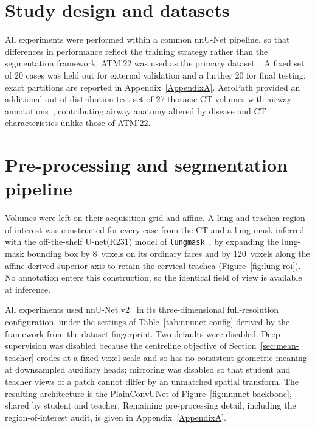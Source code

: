 \section{Study design and datasets}

All experiments were performed within a common nnU-Net pipeline, so that differences in
performance reflect the training strategy rather than the segmentation framework. ATM'22 was
used as the primary
dataset~\cite{zhang2023atm22,zhang2022cfda,zheng2021gradient,yu2022break,qin2019airwaynet,zhang2021fda}.
A fixed set of 20 cases was held out for external validation and a further 20 for final
testing; exact partitions are reported in Appendix~\ref{AppendixA}. AeroPath provided an
additional out-of-distribution test set of 27 thoracic CT volumes with airway
annotations~\cite{stoverud2023aeropath}, contributing airway anatomy altered by disease and CT
characteristics unlike those of ATM'22.

\section{Pre-processing and segmentation pipeline}
\label{sec:pipeline}

Volumes were left on their acquisition grid and affine. A lung and trachea region of interest
was constructed for every case from the CT and a lung mask inferred with the off-the-shelf
U-net(R231) model of \texttt{lungmask}~\cite{hofmanninger2020lungmask}, by expanding the
lung-mask bounding box by 8~voxels on its ordinary faces and by 120~voxels along the
affine-derived superior axis to retain the cervical trachea
(Figure~\ref{fig:lung-roi}). No annotation enters this construction, so the identical
field of view is available at inference.

All experiments used nnU-Net v2~\cite{isensee2021nnunet} in its three-dimensional
full-resolution configuration, under the settings of Table~\ref{tab:nnunet-config} derived by
the framework from the dataset fingerprint. Two defaults were disabled. Deep supervision was
disabled because the centreline objective of Section~\ref{sec:mean-teacher} erodes at a fixed
voxel scale and so has no consistent geometric meaning at downsampled auxiliary heads;
mirroring was disabled so that student and teacher views of a patch cannot differ by an
unmatched spatial transform. The resulting architecture is the PlainConvUNet of
Figure~\ref{fig:nnunet-backbone}, shared by student and teacher. Remaining pre-processing
detail, including the region-of-interest audit, is given in Appendix~\ref{AppendixA}.

